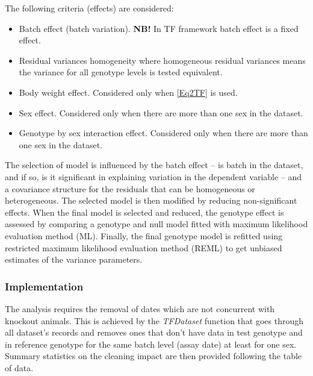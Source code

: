 \documentclass[12pt,a4paper]{article}
\begin{document}
The following criteria (effects) are considered:
\begin{itemize}
\item Batch effect (batch variation). \textbf{NB!} In TF framework batch effect is a fixed effect. 
\item Residual variances homogeneity where homogeneous residual variances means the variance for all genotype levels is tested equivalent.
\item Body weight effect. Considered only when \ref{Eq2TF} is used.
\item Sex effect. Considered only when there are more than one sex in the dataset. 
\item Genotype by sex interaction effect. Considered only when there are more than one sex in the dataset. 
\end{itemize}

The selection of model is influenced by the batch effect -- is batch in the dataset, and if so, is it significant in explaining variation in the dependent variable -- and a covariance structure for the residuals that can be homogeneous or heterogeneous. The selected model is then modified by reducing non-significant effects. When the final model is selected and reduced, the genotype effect is assessed by comparing a genotype and null model fitted with maximum likelihood evaluation method (ML). Finally, the final genotype model is refitted using restricted maximum likelihood evaluation method (REML) to get unbiased estimates of the variance parameters.
\subsubsection{Implementation}
The analysis requires the removal of dates which are not concurrent with knockout animals.  This is achieved by the \textit{TFDataset} function that goes through all dataset's records and removes ones that don't have data in test genotype and in reference genotype for the same batch level (assay date) at least for one sex. Summary statistics on the cleaning impact are then provided following the table of data.  
\end{document}
